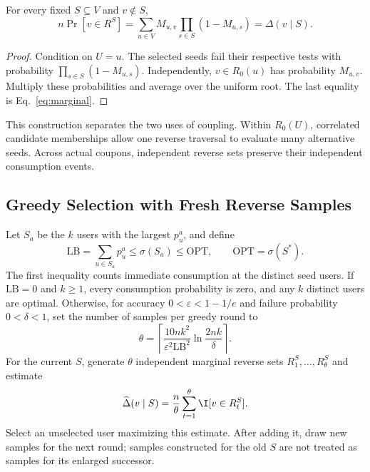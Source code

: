 \begin{lemma}
\label{lem:unbiased}
For every fixed $S\subseteq V$ and $v\notin S$,
\begin{equation}
\label{eq:marginal-unbiased}
  n\Pr[v\in R^S]
   =\sum_{u\in V}M_{u,v}\prod_{s\in S}(1-M_{u,s})
   =\Delta(v\mid S).
\end{equation}
\end{lemma}

\begin{proof}
Condition on $U=u$. The selected seeds fail their respective tests
with probability $\prod_{s\in S}(1-M_{u,s})$.
Independently, $v\in R_0(u)$ has probability $M_{u,v}$.
Multiply these probabilities and average over the uniform root.
The last equality is Eq.~\eqref{eq:marginal}.
\end{proof}

This construction separates the two uses of coupling. Within
$R_0(U)$, correlated candidate memberships allow one reverse traversal
to evaluate many alternative seeds. Across actual coupons, independent
reverse sets preserve their independent consumption events.

\subsection{Greedy Selection with Fresh Reverse Samples}
\label{sec:reverse-greedy}

Let $S_a$ be the $k$ users with the largest $p_u^a$, and define
\[
  \mathrm{LB}=\sum_{u\in S_a}p_u^a
       \leq\sigma(S_a)\leq\mathrm{OPT},\qquad
  \mathrm{OPT}=\sigma(S^*).
\]
The first inequality counts immediate consumption at the distinct
seed users. If $\mathrm{LB}=0$ and $k\geq1$, every consumption
probability is zero, and any $k$ distinct users are optimal.
Otherwise, for accuracy $0<\varepsilon<1-1/e$ and failure probability
$0<\delta<1$, set the number of samples per greedy round to
\begin{equation}
\label{eq:sample-budget}
  \theta=\left\lceil
     \frac{10nk^2}{\varepsilon^2\mathrm{LB}^2}
     \ln\frac{2nk}{\delta}
  \right\rceil.
\end{equation}
For the current $S$, generate $\theta$ independent marginal reverse
sets $R_1^S,\ldots,R_\theta^S$ and estimate
\[
  \widehat\Delta(v\mid S)
     =\frac n\theta\sum_{t=1}^{\theta}\I[v\in R_t^S].
\]
Select an unselected user maximizing this estimate. After adding it,
draw new samples for the next round; samples constructed for the old
$S$ are not treated as samples for its enlarged successor.

